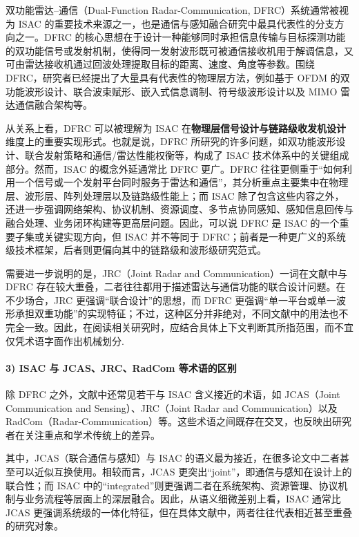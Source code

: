 双功能雷达--通信（Dual-Function Radar-Communication, DFRC）系统通常被视为 ISAC 的重要技术来源之一，也是通信与感知融合研究中最具代表性的分支方向之一\cite{Hassanien2015dual,Liu2020JointRadarComm}。DFRC 的核心思想在于设计一种能够同时承担信息传输与目标探测功能的双功能信号或发射机制，使得同一发射波形既可被通信接收机用于解调信息，又可由雷达接收机通过回波处理提取目标的距离、速度、角度等参数。围绕 DFRC，研究者已经提出了大量具有代表性的物理层方法，例如基于 OFDM 的双功能波形设计、联合波束赋形、嵌入式信息调制、符号级波形设计以及 MIMO 雷达通信融合架构等\cite{Hassanien2015dual,Zhang2021ISAC6G}。

从关系上看，DFRC 可以被理解为 ISAC 在\textbf{物理层信号设计与链路级收发机设计}维度上的重要实现形式。也就是说，DFRC 所研究的许多问题，如双功能波形设计、联合发射策略和通信/雷达性能权衡等，构成了 ISAC 技术体系中的关键组成部分。然而，ISAC 的概念外延通常比 DFRC 更广\cite{Liu2022ISAC,Gonzalez2024integrated}。DFRC 往往更侧重于“如何利用一个信号或一个发射平台同时服务于雷达和通信”，其分析重点主要集中在物理层、波形层、阵列处理层以及链路级性能上；而 ISAC 除了包含这些内容之外，还进一步强调网络架构、协议机制、资源调度、多节点协同感知、感知信息回传与融合处理、业务闭环构建等更高层问题。因此，可以说 DFRC 是 ISAC 的一个重要子集或关键实现方向，但 ISAC 并不等同于 DFRC；前者是一种更广义的系统级技术框架，后者则更偏向其中的链路级和波形级研究范式。

需要进一步说明的是，JRC（Joint Radar and Communication）一词在文献中与 DFRC 存在较大重叠，二者往往都用于描述雷达与通信功能的联合设计问题\cite{Liu2020JointRadarComm,Zhang2021ISAC6G}。在不少场合，JRC 更强调“联合设计”的思想，而 DFRC 更强调“单一平台或单一波形承担双重功能”的实现特征；不过，这种区分并非绝对，不同文献中的用法也不完全一致。因此，在阅读相关研究时，应结合具体上下文判断其所指范围，而不宜仅凭术语字面作出机械划分.

\paragraph{3) ISAC 与 JCAS、JRC、RadCom 等术语的区别}

除 DFRC 之外，文献中还常见若干与 ISAC 含义接近的术语，如 JCAS（Joint Communication and Sensing）、JRC（Joint Radar and Communication）以及 RadCom（Radar-Communication）等\cite{Liu2022ISAC,Gonzalez2024integrated}。这些术语之间既存在交叉，也反映出研究者在关注重点和学术传统上的差异。

其中，JCAS（联合通信与感知）与 ISAC 的语义最为接近，在很多论文中二者甚至可以近似互换使用。相较而言，JCAS 更突出“joint”，即通信与感知在设计上的联合性；而 ISAC 中的“integrated”则更强调二者在系统架构、资源管理、协议机制与业务流程等层面上的深层融合。因此，从语义细微差别上看，ISAC 通常比 JCAS 更强调系统级的一体化特征，但在具体文献中，两者往往代表相近甚至重叠的研究对象。

